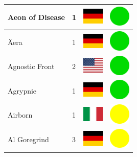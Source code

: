 \documentclass[12pt, a4paper, twoside]{report}
\begin{document}
\begin{center}
\begin{longtable}{|p{5cm}|p{2cm}|p{2cm}|p{2cm}|}
			Aeon of Disease & 1 & \includegraphics[width=1cm]{4x3/de} & \includegraphics[width=1cm]{likes/y} \\ \hline
			Äera & 1 & \includegraphics[width=1cm]{4x3/de} & \includegraphics[width=1cm]{likes/y} \\ \hline
			Agnostic Front & 2 & \includegraphics[width=1cm]{4x3/us} & \includegraphics[width=1cm]{likes/y} \\ \hline
			Agrypnie & 1 & \includegraphics[width=1cm]{4x3/de} & \includegraphics[width=1cm]{likes/y} \\ \hline
			Airborn & 1 & \includegraphics[width=1cm]{4x3/it} & \includegraphics[width=1cm]{likes/m} \\ \hline
			Al Goregrind & 3 & \includegraphics[width=1cm]{4x3/de} & \includegraphics[width=1cm]{likes/m} \\ \hline

\end{longtable}
\end{center}
\end{document}
